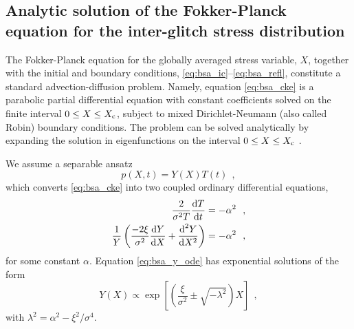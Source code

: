 \begin{subappendices}

\section{Analytic solution of the Fokker-Planck equation for the inter-glitch stress distribution}
\label{app:bsa_p_refl}

The Fokker-Planck equation for the globally averaged stress variable, $X$, together with the initial and boundary conditions, \eqref{eq:bsa_ic}--\eqref{eq:bsa_refl}, constitute a standard advection-diffusion problem. Namely, equation \eqref{eq:bsa_cke} is a parabolic partial differential equation with constant coefficients solved on the finite interval $0 \leq X \leq X_\textrm{c}$, subject to mixed Dirichlet-Neumann (also called Robin) boundary conditions. The problem can be solved analytically by expanding the solution in eigenfunctions on the interval $0 \leq X \leq X_\textrm{c}$ \citep{Sweet1970}.

We assume a separable ansatz 
\begin{equation}
p(X, t) = Y(X) T(t)\ \ ,
\end{equation}
which converts \eqref{eq:bsa_cke} into two coupled ordinary differential equations,
\begin{align}
\label{eq:bsa_t_orig}
\frac{2}{\sigma^2 T} \frac{\textrm{d} T}{\textrm{d} t} &= -\alpha^2\ \ ,\\
\frac{1}{Y} \left(\frac{-2\xi}{\sigma^2} \frac{\textrm{d} Y}{\textrm{d} X} + \frac{\textrm{d}^2 Y}{\textrm{d} X^2} \right) &= -\alpha^2\ \ , \label{eq:bsa_y_ode}
\end{align}
for some constant $\alpha$. Equation \eqref{eq:bsa_y_ode} has exponential solutions of the form
\begin{equation}
Y(X) \propto \exp\left[\left(\frac{\xi}{\sigma^2} \pm \sqrt{-\lambda^2}\right) X\right]\ \ ,
\label{eq:bsa_ysol}
\end{equation}
with $\lambda^2 = \alpha^2 - \xi^2/\sigma^4$. 


\end{subappendices}
